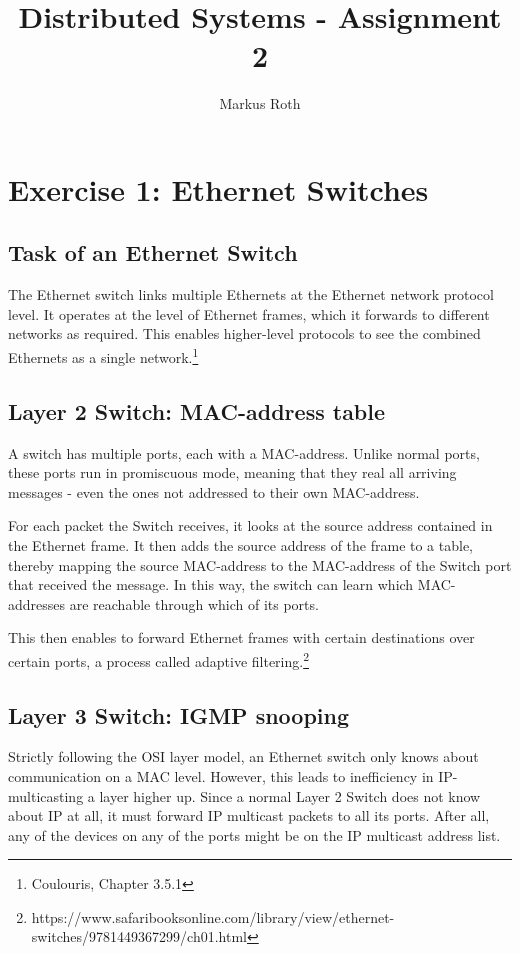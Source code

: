 \documentclass[a4paper]{article}
\title{Distributed Systems - Assignment 2}
\author{Markus Roth}
\begin{document}
\maketitle

\section{Exercise 1: Ethernet Switches}

\subsection{Task of an Ethernet Switch}

The Ethernet switch links multiple Ethernets at the Ethernet network protocol level. It operates at the level of Ethernet frames, which it forwards to different networks as required. This enables higher-level protocols to see the combined Ethernets as a single network.\footnote{Coulouris, Chapter 3.5.1}

\subsection{Layer 2 Switch: MAC-address table}

A switch has multiple ports, each with a MAC-address. Unlike normal ports, these ports run in promiscuous mode, meaning that they real all arriving messages - even the ones not addressed to their own MAC-address. 

For each packet the Switch receives, it looks at the source address contained in the Ethernet frame. It then adds the source address of the frame to a table, thereby mapping the source MAC-address to the MAC-address of the Switch port that received the message. In this way, the switch can learn which MAC-addresses are reachable through which of its ports.

This then enables to forward Ethernet frames with certain destinations over certain ports, a process called adaptive filtering.\footnote{https://www.safaribooksonline.com/library/view/ethernet-switches/9781449367299/ch01.html}

\subsection{Layer 3 Switch: IGMP snooping}

Strictly following the OSI layer model, an Ethernet switch only knows about communication on a MAC level. However, this leads to inefficiency in IP-multicasting a layer higher up. Since a normal Layer 2 Switch does not know about IP at all, it must forward IP multicast packets to all its ports. After all, any of the devices on any of the ports might be on the IP multicast address list.
\end{document}
